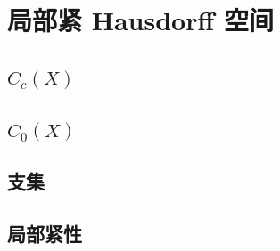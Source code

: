 \section{局部紧 Hausdorff 空间}
\label{b1:sec:1101}


\subsection{\texorpdfstring{\(C_c(X)\)}{Cc(X)}}
\label{b1:subsec:110101}

\subsection{\texorpdfstring{\(C_0(X)\)}{C0(X)}}
\label{b1:subsec:110102}

\subsection{支集}
\label{b1:subsec:110103}

\subsection{局部紧性}
\label{b1:subsec:110104}


